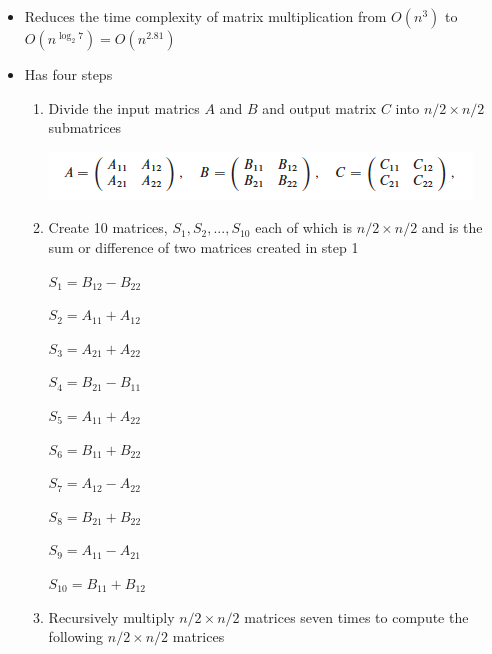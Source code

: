 \documentclass[12pt]{article}
\begin{document}
\begin{enumerate}[1.]
\begin{itemize}
        \begin{itemize}
            \item Reduces the time complexity of matrix multiplication from $O(n^3)$ to $O(n^{\log_2 7}) = O(n^{2.81})$

            \item Has four steps

            \bigskip

            \begin{enumerate}[1)]
                \item Divide the input matrics $A$ and $B$ and output matrix $C$
                into $n/2 \times n/2$ submatrices

                \begin{center}
                \includegraphics[width=0.7\linewidth]{images/worksheet_1_solution_1.png}
                \end{center}

                \item Create 10 matrices, $S_1, S_2, ..., S_{10}$ each of which is
                $n/2 \times n/2$ and is the sum or difference of two matrices created in step 1

                \bigskip

                $S_1 = B_{12} - B_{22}$

                $S_2 = A_{11} + A_{12}$

                $S_3 = A_{21} + A_{22}$

                $S_4 = B_{21} - B_{11}$

                $S_5 = A_{11} + A_{22}$

                $S_6 = B_{11} + B_{22}$

                $S_7 = A_{12} - A_{22}$

                $S_8 = B_{21} + B_{22}$

                $S_9 = A_{11} - A_{21}$

                $S_{10} = B_{11} + B_{12}$

                \bigskip

                \item Recursively multiply $n/2 \times n/2$ matrices seven times to
                compute the following $n/2 \times n/2$ matrices


\end{enumerate}
\end{itemize}
\end{itemize}
\end{enumerate}
\end{document}
